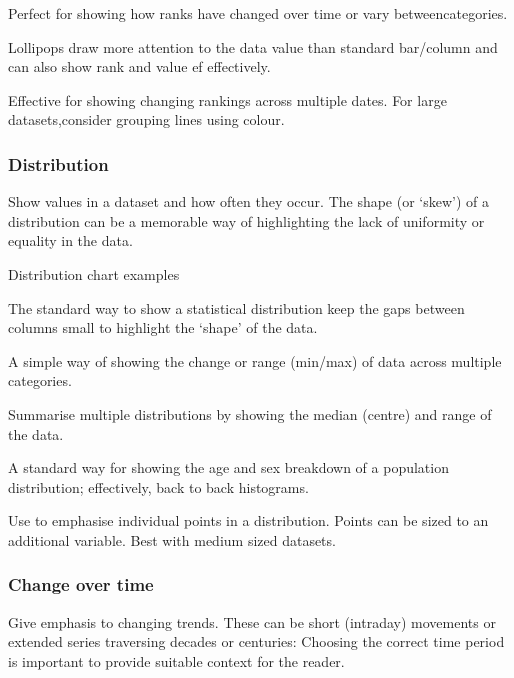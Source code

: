 \documentclass[letterpaper,10pt,english]{jupyterBook}
\begin{document}
\sphinxAtStartPar
{} Perfect for showing how ranks have changed over time or vary betweencategories.

\sphinxAtStartPar
{} Lollipops draw more attention to the data value than standard bar/column and can also show rank and
value ef effectively.

\sphinxAtStartPar
{} Effective for showing changing rankings across multiple dates. For large datasets,consider grouping lines
using colour.


\subsubsection{Distribution}
\label{\detokenize{part1/communication:distribution}}
\sphinxAtStartPar
Show values in a dataset and how often they occur. The shape (or ‘skew’) of a distribution can be a memorable way of highlighting the lack of uniformity or equality in the data.

\sphinxAtStartPar
{}

\sphinxAtStartPar
Distribution chart examples

\sphinxAtStartPar
{} The standard way to show a statistical distribution \sphinxhyphen{} keep the gaps between columns small to highlight the ‘shape’ of the data.

\sphinxAtStartPar
{} A simple way of showing the change or range (min/max) of data across multiple categories.

\sphinxAtStartPar
{} Summarise multiple distributions by showing the median (centre) and range of the data.

\sphinxAtStartPar
{} A standard way for showing the age and sex breakdown of a population distribution;
effectively, back to back histograms.

\sphinxAtStartPar
{} Use to emphasise individual points in a distribution. Points can be sized to an additional variable.
Best with medium sized datasets.


\subsubsection{Change over time}
\label{\detokenize{part1/communication:change-over-time}}
\sphinxAtStartPar
Give emphasis to changing trends. These can be short (intra\sphinxhyphen{}day) movements or extended series traversing decades or centuries: Choosing the correct time period is important to provide suitable context for the reader.
\end{document}
